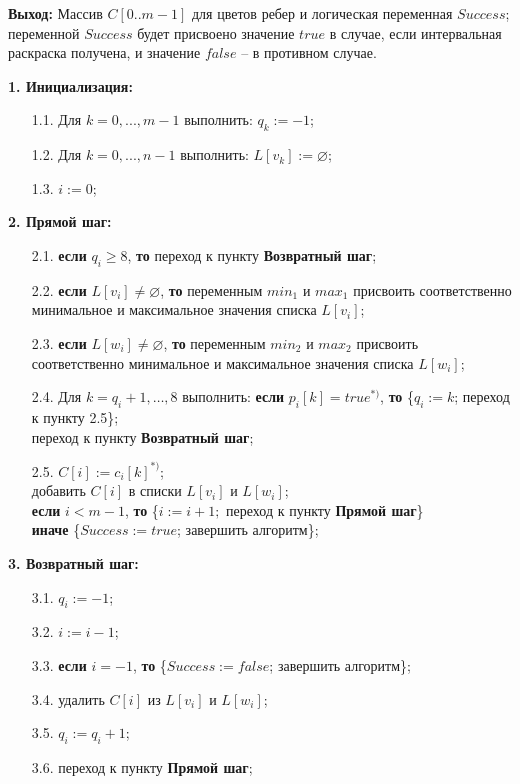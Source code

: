 \textbf{ Выход: }
Массив $C[0..m-1]$ для цветов ребер и логическая переменная $Success$; переменной $Success$ будет присвоено значение $true$ в случае, если интервальная раскраска получена, и значение $false$ -- в противном случае.
\par\smallskip
\noindent\textbf{ 1. Инициализация:}
\begin{itemize}
	\item [1.1.] Для $k=0, ..., m-1$ выполнить: $q_k:=-1$;
	\item [1.2.] Для $k=0, ..., n-1$ выполнить: $L[v_k]:=\varnothing$;
	\item [1.3.] $i:=0$;
\end{itemize}
\noindent\textbf{ 2. Прямой шаг:}
\begin{itemize}
	\item [2.1.] \textbf{ если} $q_i\geq 8$, \textbf{ то} переход к пункту \textbf{ Возвратный шаг};
	\item [2.2.] \textbf{ если} $L[v_i]\neq \varnothing$, \textbf{ то} переменным $min_1$ и $max_1$ присвоить соответственно минимальное и максимальное значения списка $L[v_i]$;
	\item [2.3.] \textbf{ если} $L[w_i]\neq \varnothing$, \textbf{ то} переменным $min_2$ и $max_2$ присвоить соответственно минимальное и максимальное значения списка $L[w_i]$;
	\item [2.4.] Для $k=q_i+1, \dots, 8$ выполнить: \textbf{ если} $p_i[k]=true^{*)}$, \textbf{ то}
	\{$q_i:=k$; переход к пункту 2.5\};\\
	переход к пункту \textbf{ Возвратный шаг};
	\item [2.5.]		$C[i]:=c_i[k]^{*)}$;\\
	  добавить $C[i]$ в списки $L[v_i]$ и $L[w_i]$;\\
		\textbf{ если} $i<m-1$, \textbf{ то} \{$i:=i+1;$ переход к пункту \textbf{ Прямой шаг}\}\\
		\textbf{ иначе} \{$Success:=true$;	завершить алгоритм\};
\end{itemize}
\noindent\textbf{ 3. Возвратный шаг:}
\begin{itemize}
	\item [3.1.] $q_i:=-1$;
	\item [3.2.] $i:=i-1$;
	\item [3.3.] \textbf{ если} $i=-1$, \textbf{ то} \{$Success:=false$; завершить алгоритм\};
	\item [3.4.] удалить $C[i]$ из $L[v_i]$ и $L[w_i]$;
	\item [3.5.] $q_i:=q_i+1$;
	\item [3.6.] переход к пункту \textbf{ Прямой шаг};
\end{itemize}


